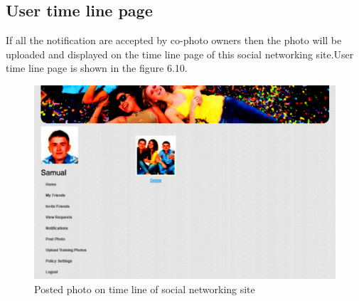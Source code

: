  \subsection[ User Time Line Page]{User time line page}
\noindent
If all the notification are accepted by co-photo owners then the  photo will be uploaded  and displayed on the time line page  of  this social networking site.User time line page is shown in the figure 6.10.
\vspace{1cm} 
\vspace{1cm}
\vspace{1cm}
\begin{figure}[H]
\begin{minipage}[c]{1\linewidth}
\begin{center}
\includegraphics[width=\textwidth]{photoposted.png}
            \caption[Posted Photo on Time Line of Social Networking Site]{Posted photo on time line of social networking site}
             \label{Posted photo on time line of Social Networking site}
\end{center}
  \end{minipage}            
\end{figure}
\clearpage

